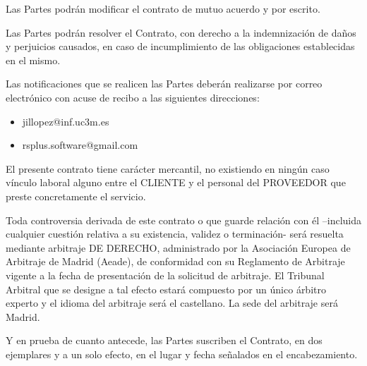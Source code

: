 \begin{description}[style=nextline]
\item[SÉPTIMA.- MODIFICACIÓN]
\par Las Partes podrán modificar el contrato de mutuo acuerdo y por escrito.

\item[OCTAVA.- RESOLUCIÓN]
\par Las Partes podrán resolver el Contrato, con derecho a la indemnización de daños y perjuicios causados, en caso de incumplimiento de las obligaciones establecidas en el mismo.

\item[NOVENA.- NOTIFICACIONES]
	\par Las notificaciones que se realicen las Partes deberán realizarse por correo electrónico con acuse de recibo a las siguientes direcciones:
  \begin{itemize}[-]
    \item jillopez@inf.uc3m.es
    \item rsplus.software@gmail.com
  \end{itemize}

\item[DÉCIMA.- REGIMEN JURÍDICO]
\par El presente contrato tiene carácter mercantil, no existiendo en ningún caso vínculo laboral alguno entre el CLIENTE  y el personal del PROVEEDOR que preste concretamente el servicio.
\par Toda controversia derivada de este contrato o que guarde relación con él –incluida cualquier cuestión relativa a su existencia, validez o terminación- será resuelta mediante arbitraje DE DERECHO, administrado por la Asociación Europea de Arbitraje de Madrid (Aeade), de conformidad con su Reglamento de Arbitraje vigente a la fecha de presentación de la solicitud de arbitraje. El Tribunal Arbitral que se designe a tal efecto estará compuesto por un único árbitro experto y el idioma del arbitraje será el castellano. La sede del arbitraje será Madrid.

\end{description}
\par Y en prueba de cuanto antecede, las Partes suscriben el Contrato, en dos ejemplares y a un solo efecto, en el lugar y fecha señalados en el encabezamiento.
